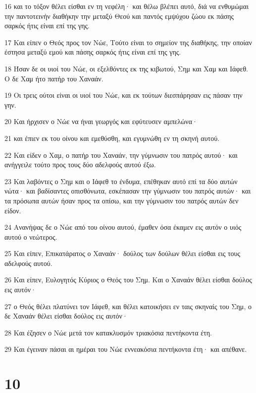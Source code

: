 \par 16 και το τόξον θέλει είσθαι εν τη νεφέλη· και θέλω βλέπει αυτό, διά να ενθυμώμαι την παντοτεινήν διαθήκην την μεταξύ Θεού και παντός εμψύχου ζώου εκ πάσης σαρκός ήτις είναι επί της γης.
\par 17 Και είπεν ο Θεός προς τον Νώε, Τούτο είναι το σημείον της διαθήκης, την οποίαν έστησα μεταξύ εμού και πάσης σαρκός ήτις είναι επί της γης.
\par 18 Ήσαν δε οι υιοί του Νώε, οι εξελθόντες εκ της κιβωτού, Σημ και Χαμ και Ιάφεθ. Ο δε Χαμ ήτο πατήρ του Χαναάν.
\par 19 Οι τρεις ούτοι είναι οι υιοί του Νώε, και εκ τούτων διεσπάρησαν εις πάσαν την γην.
\par 20 Και ήρχισεν ο Νώε να ήναι γεωργός και εφύτευσεν αμπελώνα·
\par 21 και έπιεν εκ του οίνου και εμεθύσθη, και εγυμνώθη εν τη σκηνή αυτού.
\par 22 Και είδεν ο Χαμ, ο πατήρ του Χαναάν, την γύμνωσιν του πατρός αυτού· και ανήγγειλε τούτο προς τους δύο αδελφούς αυτού έξω.
\par 23 Και λαβόντες ο Σημ και ο Ιάφεθ το ένδυμα, επέθηκαν αυτό επί τα δύο αυτών νώτα· και βαδίσαντες οπισθόνωτα, εσκέπασαν την γύμνωσιν του πατρός αυτών· και τα πρόσωπα αυτών ήσαν προς τα οπίσω, και την γύμνωσιν του πατρός αυτών δεν είδον.
\par 24 Ανανήψας δε ο Νώε από του οίνου αυτού, έμαθεν όσα έκαμεν εις αυτόν ο υιός αυτού ο νεώτερος.
\par 25 Και είπεν, Επικατάρατος ο Χαναάν· δούλος των δούλων θέλει είσθαι εις τους αδελφούς αυτού.
\par 26 Και είπεν, Ευλογητός Κύριος ο Θεός του Σημ. Και ο Χαναάν θέλει είσθαι δούλος εις αυτόν·
\par 27 ο Θεός θέλει πλατύνει τον Ιάφεθ, και θέλει κατοικήσει εν ταις σκηναίς του Σημ, ο δε Χαναάν θέλει είσθαι δούλος εις αυτόν·
\par 28 Και έζησεν ο Νώε μετά τον κατακλυσμόν τριακόσια πεντήκοντα έτη.
\par 29 Και έγειναν πάσαι αι ημέραι του Νώε εννεακόσια πεντήκοντα έτη· και απέθανε.

\chapter{10}

